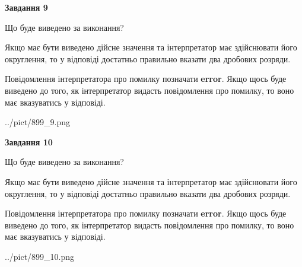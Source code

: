 \documentclass[12pt, ukrainian]{article}
\begin{document}
{\begin {Large}
{\begin {center}\textbf{Завдання 9}\end {center}}\par
Що буде виведено за виконання? \par

Якщо має бути виведено дійсне значення та інтерпретатор має здійснювати його округлення, 
то у відповіді достатньо правильно вказати два дробових розряди.

Повідомлення інтерпретатора про помилку позначати \textbf{error}.
Якщо щось буде виведено до того, як інтерпретатор видасть повідомлення про помилку, 
то воно має вказуватись у відповіді. \par

\begin{center}
	{../pict/899_9.png}
\end{center}
\newpage

{\begin {center}\textbf{Завдання 10}\end {center}}\par
Що буде виведено за виконання? \par

Якщо має бути виведено дійсне значення та інтерпретатор має здійснювати його округлення, 
то у відповіді достатньо правильно вказати два дробових розряди.

Повідомлення інтерпретатора про помилку позначати \textbf{error}.
Якщо щось буде виведено до того, як інтерпретатор видасть повідомлення про помилку, 
то воно має вказуватись у відповіді. \par

\begin{center}
	{../pict/899_10.png}
\end{center}
\newpage

\end {Large}}
\end{document}
